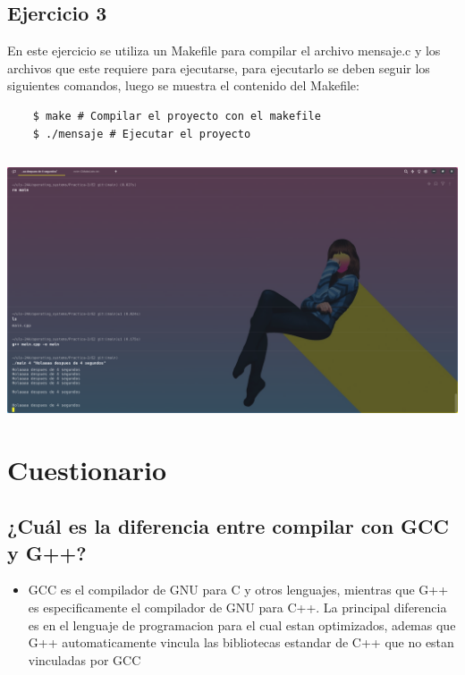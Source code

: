 \documentclass[]{article}
\newenvironment{code}{\captionsetup{type=listing}}{}
\begin{document}
\subsection{Ejercicio 3}
En este ejercicio se utiliza un Makefile para compilar el archivo mensaje.c
y los archivos que este requiere para ejecutarse, para ejecutarlo se deben 
seguir los siguientes comandos, luego se muestra el contenido del Makefile:
\begin{verbatim}
	$ make # Compilar el proyecto con el makefile
	$ ./mensaje # Ejecutar el proyecto
\end{verbatim}

\begin{code}
	\label{code:c-code}
	\inputminted{Makefile}{../E3/Makefile}
\end{code}
		
\includegraphics[scale=0.3,trim={0 0 20cm 20cm},clip]{e2-out.png}  


\section{Cuestionario}
        \subsection{¿Cuál es la diferencia entre compilar con GCC y G++?}
        \begin{itemize}
            \item GCC es el compilador de GNU para C y otros lenguajes, mientras que G++ es especificamente el compilador de GNU para C++. La principal diferencia es en el lenguaje de programacion para el cual estan optimizados, ademas que G++ automaticamente vincula las bibliotecas estandar de C++ que no estan vinculadas por GCC
       \end{itemize}
\end{document}
